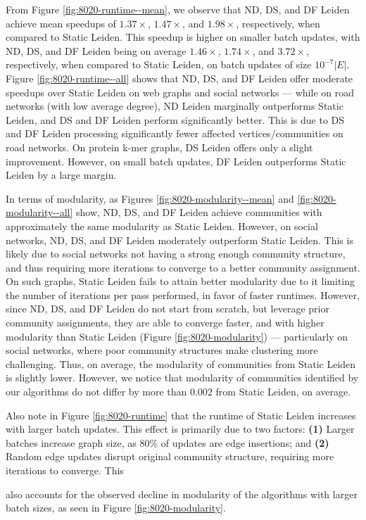 From Figure \ref{fig:8020-runtime--mean}, we observe that ND, DS, and DF Leiden achieve mean speedups of $1.37\times$, $1.47\times$, and $1.98\times$, respectively, when compared to Static Leiden. This speedup is higher on smaller batch updates, with ND, DS, and DF Leiden being on average $1.46\times$, $1.74\times$, and $3.72\times$, respectively, when compared to Static Leiden, on batch updates of size $10^{-7}|E|$. Figure \ref{fig:8020-runtime--all} shows that ND, DS, and DF Leiden offer moderate speedups over Static Leiden on web graphs and social networks --- while on road networks (with low average degree), ND Leiden marginally outperforms Static Leiden, and DS and DF Leiden perform significantly better. This is due to DS and DF Leiden processing significantly fewer affected vertices/communities on road networks. On protein k-mer graphs, DS Leiden offers only a slight improvement. However, on small batch updates, DF Leiden outperforms Static Leiden by a large margin.

In terms of modularity, as Figures \ref{fig:8020-modularity--mean} and \ref{fig:8020-modularity--all} show, ND, DS, and DF Leiden achieve communities with approximately the same modularity as Static Leiden. However, on social networks, ND, DS, and DF Leiden moderately outperform Static Leiden. This is likely due to social networks not having a strong enough community structure, and thus requiring more iterations to converge to a better community assignment. On such graphs, Static Leiden fails to attain better modularity due to it limiting the number of iterations per pass performed, in favor of faster runtimes. However, since ND, DS, and DF Leiden do not start from scratch, but leverage prior community assignments, they are able to converge faster, and with higher modularity than Static Leiden (Figure \ref{fig:8020-modularity}) --- particularly on social networks, where poor community structures make clustering more challenging. Thus, on average, the modularity of communities from Static Leiden is slightly lower. However, we notice that modularity of communities identified by our algorithms do not differ by more than $0.002$ from Static Leiden, on average.

Also note in Figure \ref{fig:8020-runtime} that the runtime of Static Leiden increases with larger batch updates. This effect is primarily due to two factors: \textbf{(1)} Larger batches increase graph size, as $80\%$ of updates are edge insertions; and \textbf{(2)} Random edge updates disrupt original community structure, requiring more iterations to converge. This also accounts for the observed decline in modularity of the algorithms with larger batch sizes, as seen in Figure \ref{fig:8020-modularity}.

